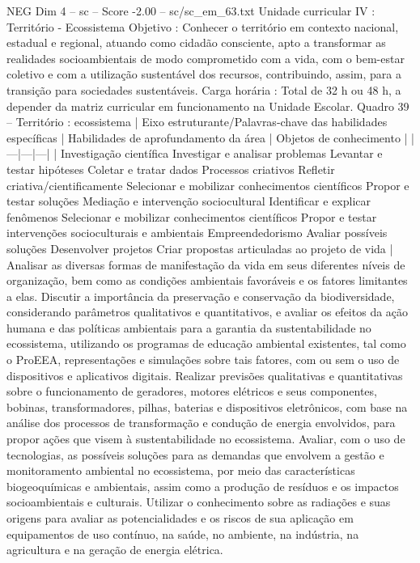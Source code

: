 \begin{textsample}{NEG Dim 4 – sc – Score -2.00 – sc/sc\_em\_63.txt}
Unidade curricular IV : Território - Ecossistema Objetivo : Conhecer o território em contexto nacional, estadual e regional, atuando como cidadão consciente, apto a transformar as realidades socioambientais de modo comprometido com a vida, com o bem-estar coletivo e com a utilização sustentável dos recursos, contribuindo, assim, para a transição para sociedades sustentáveis.
Carga horária : Total de 32 h ou 48 h, a depender da matriz curricular em funcionamento na Unidade Escolar.
Quadro 39 – Território : ecossistema | Eixo estruturante/Palavras-chave das habilidades específicas | Habilidades de aprofundamento da área | Objetos de conhecimento | |---|---|---| | Investigação científica Investigar e analisar problemas Levantar e testar hipóteses Coletar e tratar dados Processos criativos Refletir criativa/cientificamente Selecionar e mobilizar conhecimentos científicos Propor e testar soluções Mediação e intervenção sociocultural Identificar e explicar fenômenos Selecionar e mobilizar conhecimentos científicos Propor e testar intervenções socioculturais e ambientais Empreendedorismo Avaliar possíveis soluções Desenvolver projetos Criar propostas articuladas ao projeto de vida | Analisar as diversas formas de manifestação da vida em seus diferentes níveis de organização, bem como as condições ambientais favoráveis e os fatores limitantes a elas.
Discutir a importância da preservação e conservação da biodiversidade, considerando parâmetros qualitativos e quantitativos, e avaliar os efeitos da ação humana e das políticas ambientais para a garantia da sustentabilidade no ecossistema, utilizando os programas de educação ambiental existentes, tal como o ProEEA, representações e simulações sobre tais fatores, com ou sem o uso de dispositivos e aplicativos digitais.
Realizar previsões qualitativas e quantitativas sobre o funcionamento de geradores, motores elétricos e seus componentes, bobinas, transformadores, pilhas, baterias e dispositivos eletrônicos, com base na análise dos processos de transformação e condução de energia envolvidos, para propor ações que visem à sustentabilidade no ecossistema.
Avaliar, com o uso de tecnologias, as possíveis soluções para as demandas que envolvem a gestão e monitoramento ambiental no ecossistema, por meio das características biogeoquímicas e ambientais, assim como a produção de resíduos e os impactos socioambientais e culturais.
Utilizar o conhecimento sobre as radiações e suas origens para avaliar as potencialidades e os riscos de sua aplicação em equipamentos de uso contínuo, na saúde, no ambiente, na indústria, na agricultura e na geração de energia elétrica.

\end{textsample}
